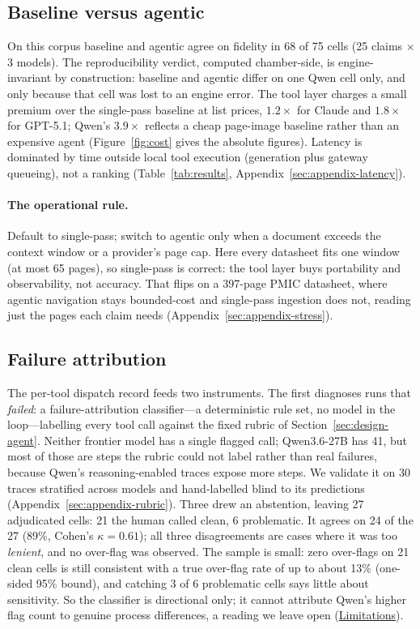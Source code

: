 \documentclass[11pt]{article}
\begin{document}
\subsection{Baseline versus agentic}
\label{sec:res-cost}
On this corpus baseline and agentic agree on fidelity in 68 of 75 cells
(25 claims $\times$ 3 models).
The reproducibility verdict, computed chamber-side, is engine-invariant
by construction: baseline and agentic differ on one Qwen cell only,
and only because that cell was lost to an engine error. The tool layer
charges a small premium over the single-pass baseline at list prices, $1.2\times$ for Claude and
$1.8\times$ for GPT-5.1; Qwen's $3.9\times$ reflects a cheap page-image
baseline rather than an expensive agent (Figure~\ref{fig:cost} gives the
absolute figures). Latency is dominated by time outside local tool
execution (generation plus gateway queueing), not a ranking
(Table~\ref{tab:results}, Appendix~\ref{sec:appendix-latency}).

\paragraph{The operational rule.}
Default to single-pass; switch to agentic only when a document exceeds
the context window or a provider's page cap. Here every datasheet fits
one window (at most 65 pages), so single-pass is correct: the tool layer
buys portability and observability, not accuracy. That flips on a
397-page PMIC datasheet, where agentic navigation stays bounded-cost and
single-pass ingestion does not, reading just the pages each claim needs
(Appendix~\ref{sec:appendix-stress}).

\subsection{Failure attribution}
\label{sec:res-attribution}
The per-tool dispatch record feeds two instruments. The first diagnoses
runs that \emph{failed}: a failure-attribution classifier---a
deterministic rule set, no model in the loop---labelling every tool call
against the fixed rubric of Section~\ref{sec:design-agent}. Neither
frontier model has a single flagged call; Qwen3.6-27B has 41, but most
of those are steps the rubric could not label rather than real
failures, because Qwen's reasoning-enabled traces expose more steps. We validate it on 30 traces stratified across models and
hand-labelled blind to its predictions
(Appendix~\ref{sec:appendix-rubric}). Three drew an abstention, leaving
27 adjudicated cells: 21 the human called clean, 6 problematic. It
agrees on 24 of the 27 (89\%, Cohen's $\kappa=0.61$); all three
disagreements are cases where it was too \emph{lenient}, and no
over-flag was observed. The sample is small: zero over-flags on 21 clean
cells is still consistent with a true over-flag rate of up to about
13\% (one-sided 95\% bound), and catching 3 of 6 problematic cells
says little about sensitivity. So the classifier is directional only;
it cannot attribute Qwen's higher flag count to genuine process
differences, a reading we leave open
(\hyperref[sec:limitations]{Limitations}).
\end{document}
